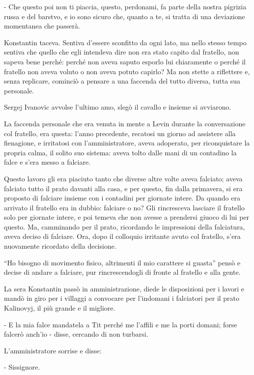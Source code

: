 - Che questo poi non ti piaccia, questo, perdonami, fa parte della nostra pigrizia russa e del barstvo, e io sono sicuro che, quanto a te, si tratta di una deviazione momentanea che passerà. 

Konstantin taceva. Sentiva d'essere sconfitto da ogni lato, ma nello stesso tempo sentiva che quello che egli intendeva dire non era stato capito dal fratello, non sapeva bene perché: perché non aveva saputo esporlo lui chiaramente o perché il fratello non aveva voluto o non aveva potuto capirlo? Ma non stette a riflettere e, senza replicare, cominciò a pensare a una faccenda del tutto diversa, tutta sua personale. 

Sergej Ivanovic avvolse l'ultimo amo, slegò il cavallo e insieme si avviarono. 

La faccenda personale che era venuta in mente a Levin durante la conversazione col fratello, era questa: l'anno precedente, recatosi un giorno ad assistere alla fienagione, e irritatosi con l'amministratore, aveva adoperato, per riconquistare la propria calma, il solito suo sistema: aveva tolto dalle mani di un contadino la falce e s'era messo a falciare. 

Questo lavoro gli era piaciuto tanto che diverse altre volte aveva falciato; aveva falciato tutto il prato davanti alla casa, e per questo, fin dalla primavera, si era proposto di falciare insieme con i contadini per giornate intere. Da quando era arrivato il fratello era in dubbio: falciare o no? Gli rincresceva lasciare il fratello solo per giornate intere, e poi temeva che non avesse a prendersi giuoco di lui per questo. Ma, camminando per il prato, ricordando le impressioni della falciatura, aveva deciso di falciare. Ora, dopo il colloquio irritante avuto col fratello, s'era nuovamente ricordato della decisione. 

``Ho bisogno di movimento fisico, altrimenti il mio carattere si guasta'' pensò e decise di andare a falciare, pur rincrescendogli di fronte al fratello e alla gente. 

La sera Konstantin passò in amministrazione, diede le disposizioni per i lavori e mandò in giro per i villaggi a convocare per l'indomani i falciatori per il prato Kalinovyj, il più grande e il migliore. 

- E la mia falce mandatela a Tit perché me l'affili e me la porti domani; forse falcerò anch'io - disse, cercando di non turbarsi. 

L'amministratore sorrise e disse: 

- Sissignore. 

